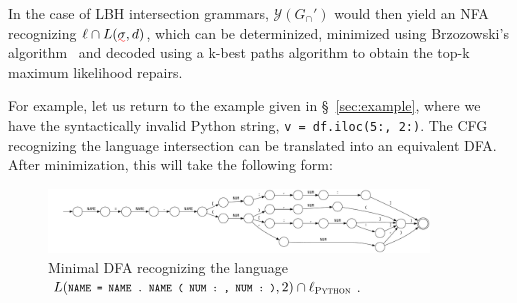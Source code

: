 \documentclass[sigplan,acmsmall,nonacm,screen]{acmart}\settopmatter{printfolios=false,printccs=false,printacmref=false}
\begin{document}
%
%
%

  In the case of LBH intersection grammars, $\mathcal{Y}(G_\cap')$ would then yield an NFA recognizing $\ell\cap L(\err\sigma, d)$, which can be determinized, minimized using Brzozowski's algorithm~\cite{brzozowski1964derivatives} and decoded using a k-best paths algorithm to obtain the top-k maximum likelihood repairs.

For example, let us return to the example given in \S~\ref{sec:example}, where we have the syntactically invalid Python string, \texttt{v = df.iloc(5:, 2:)}. The CFG recognizing the language intersection can be translated into an equivalent DFA. After minimization, this will take the following form:

\begin{figure}[H]
  \centering
  \includegraphics[width=0.9\textwidth]{exampleDFA.pdf}
  \caption{Minimal DFA recognizing the language $L(\footnotesize{\texttt{NAME = NAME . NAME ( NUM : , NUM : )}}, 2) \cap \ell_\textsc{Python}$.}
  \label{fig:exampleDFA}
\end{figure}
\end{document}
